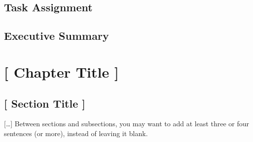 \documentclass[11pt,a4paper,english,oneside]{book}
\begin{document}
\thispagestyle{empty}
\titleGP\

\newpage

\doublespacing\
\setcounter{page}{1}

\section*{Task Assignment}
\thispagestyle{firststyle}
\newpage

\section*{Executive Summary}
\thispagestyle{firststyle}

% 
\tableofcontents
\listoffigures
\listoftables

\newpage
{}






\chapter{[ Chapter Title ]}

\section{[ Section Title ]}

[\dots] Between sections and subsections, you may want to add at least three or four sentences (or more), instead of leaving it blank.
\end{document}
